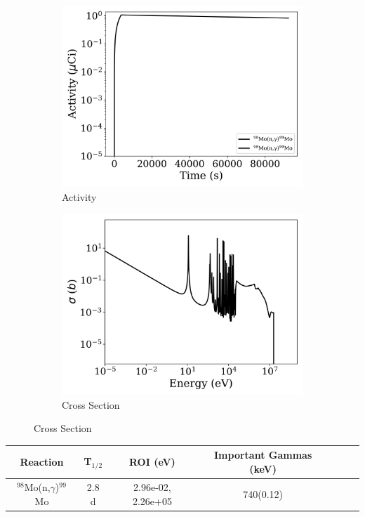\begin{figure}[h]
\centering
\begin{subfigure}{.5\textwidth}
  \centering
     \includegraphics[width=.8\textwidth]{plot/Mo-98(n,gamma)Mo-99_wisconsin1} 

  \caption{Activity}
\end{subfigure}%
\begin{subfigure}{.5\textwidth}
  \centering
     \includegraphics[width=.8\textwidth]{plot/Mo-98(n,gamma)Mo-99} 

  \caption{Cross Section}
\end{subfigure}
\end{figure}

\begin{table}[h]
\centering
\begin{tabular}{ |c|c|c|c|c|c|c| }
 \hline
 Reaction & T$_{1/2}$ & ROI (eV) & Important Gammas (keV) \\
 \hline 
 $^{98}$Mo(n,$\gamma$)$^{99}$Mo &  2.8 d & 2.96e-02, 2.26e+05 & 740(0.12) \\ 
\hline
\end{tabular}
\end{table}
